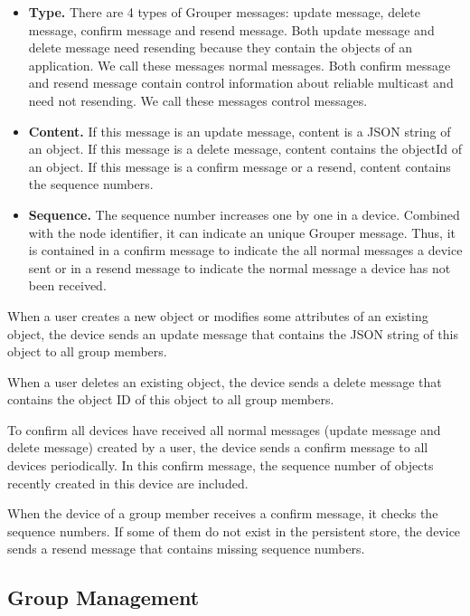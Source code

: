 \documentclass[twocolumn,10pt]{article}
\begin{document}
\begin{itemize}
	\setlength{\itemsep}{1pt}
	\setlength{\parskip}{0pt}
	\setlength{\parsep}{0pt}
	\item \textbf{Type.}
	There are 4 types of Grouper messages: update message, delete message, confirm message and resend message. 
	Both update message and delete message need resending because they contain the objects of an application. 
	We call these messages normal messages. 
	Both confirm message and resend message contain control information about reliable multicast and need not resending. 
	We call these messages control messages.
	\item \textbf{Content.} 
	If this message is an update message, content is a JSON string of an object.
	If this message is a delete message, content contains the objectId of an object.
	If this message is a confirm message or a resend, content contains the sequence numbers.
	\item \textbf{Sequence.}
	The sequence number increases one by one in a device.
	Combined with the node identifier, it can indicate an unique Grouper message.
	Thus, it is contained in a confirm message to indicate the all normal messages a device sent or in a resend message to indicate the normal message a device has not been received.
\end{itemize}

When a user creates a new object or modifies some attributes of an existing object, the device sends an update message that contains the JSON string of this object to all group members.

When a user deletes an existing object, the device sends a delete message that contains the object ID of this object to all group members.

To confirm all devices have received all normal messages (update message and delete message) created by a user, the device sends a confirm message to all devices periodically. 
In this confirm message, the sequence number of objects recently created in this device are included.

When the device of a group member receives a confirm message, it checks the sequence numbers. 
If some of them do not exist in the persistent store, the device sends a resend message that contains missing sequence numbers.

\subsection{Group Management}
\end{document}
